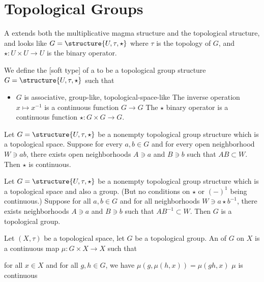 \section{Topological Groups}

\begin{definition}
A  extends both the multiplicative
magma structure and the topological structure, and looks like
$G=\structure{U,\tau,\star}$ where $\tau$ is the topology of $G$, and
$\star\colon U\times U\to U$ is the binary operator.
\end{definition}

\begin{definition}
We define the [soft type] of a  to be a
topological group structure $G=\structure{U,\tau,\star}$ such that
\begin{itemize}
\item $G$ is associative, group-like, topological-space-like
 The inverse operation $x\mapsto x^{-1}$
is a continuous function $G\to G$
 The $\star$ binary
operator is a continuous function $\star\colon G\times G\to G$.
\end{itemize}
\end{definition}

\begin{theorem}
Let $G=\structure{U,\tau,\star}$ be a nonempty topological group structure
which is a topological space.
Suppose for every $a,b\in G$ and for every open neighborhood $W\ni ab$,
there exists open neighborhoods $A\ni a$ and $B\ni b$ such that
$AB\subset W$.
Then $\star$ is continuous.
\end{theorem}

\begin{theorem}
Let $G=\structure{U,\tau,\star}$ be a nonempty topological group structure
which is a topological space and also a group. (But no conditions on
$\star$ or $(-)^{1}$ being continuous.)
Suppose for all $a,b\in G$ and for all neighborhoods $W\ni a\star b^{-1}$,
there exists neighborhoods $A\ni a$ and $B\ni b$ such that
$AB^{-1}\subset W$.
Then $G$ is a topological group.
\end{theorem}

\begin{definition}
Let $(X,\tau)$ be a topological space, let $G$ be a topological group.
An  of $G$ on $X$ is a continuous map $\mu\colon G\times X\to X$
such that
\begin{itemize}
for all $x\in X$ and for all $g,h\in G$, we have $\mu(g,\mu(h,x))=\mu(gh,x)$
 $\mu$ is continuous
\end{itemize}
\end{definition}

